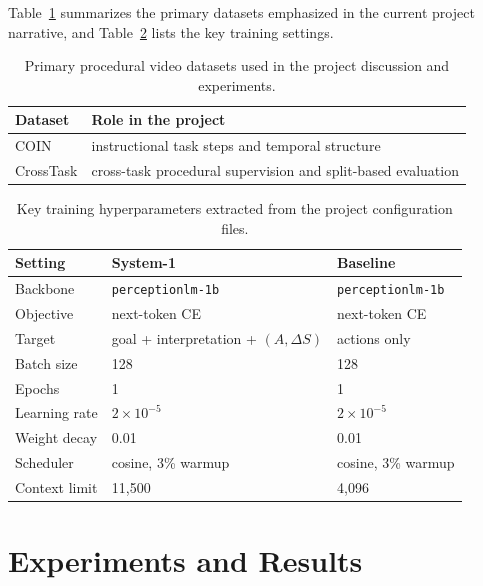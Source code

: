 \documentclass[11pt]{article}
\begin{document}
Table~\ref{tab:datasets} summarizes the primary datasets emphasized in the current project narrative, and Table~\ref{tab:hyperparams} lists the key training settings.

\begin{table}[t]
\centering
\caption{Primary procedural video datasets used in the project discussion and experiments.}
\label{tab:datasets}
\begin{tabular}{ll}
\toprule
Dataset & Role in the project \\
\midrule
COIN & instructional task steps and temporal structure \\
CrossTask & cross-task procedural supervision and split-based evaluation \\
\bottomrule
\end{tabular}
\end{table}

\begin{table}[t]
\centering
\caption{Key training hyperparameters extracted from the project configuration files.}
\label{tab:hyperparams}
\begin{tabular}{lll}
\toprule
Setting & System-1 & Baseline \\
\midrule
Backbone & \texttt{perceptionlm-1b} & \texttt{perceptionlm-1b} \\
Objective & next-token CE & next-token CE \\
Target & goal + interpretation + $(A,\Delta S)$ & actions only \\
Batch size & 128 & 128 \\
Epochs & 1 & 1 \\
Learning rate & $2\times10^{-5}$ & $2\times10^{-5}$ \\
Weight decay & 0.01 & 0.01 \\
Scheduler & cosine, 3\% warmup & cosine, 3\% warmup \\
Context limit & 11{,}500 & 4{,}096 \\
\bottomrule
\end{tabular}
\end{table}

\section{Experiments and Results}
\end{document}

